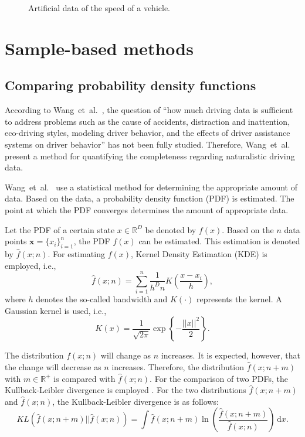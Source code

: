 \documentclass[10pt,final,a4paper,oneside,onecolumn]{article}
\newlength\figurewidth
\newlength\figureheight
\newcommand*{\ud}{\mathrm{\,d}}                                 %
\theoremstyle{plain}\newtheorem{definition}{Definition}[section]    %
\theoremstyle{definition}\newtheorem{example}{Example}[section]     %
\theoremstyle{remark}\newtheorem{remarkenv}{Remark}[section]        %
\begin{document}
\setlength{}              %
\setlength{}              %
\begin{figure}[b]
	\centering
	
	\caption{Artificial data of the speed of a vehicle.}
	\label{fig:artificial data}
\end{figure}



\section{Sample-based methods}
\label{sec:sample based}


\subsection{Comparing probability density functions}
\label{sec:sample based pdf}

According to Wang~et~al.~\cite{wang2017much}, the question of ``how much driving data is sufficient to address problems such as the cause of accidents, distraction and inattention, eco-driving styles, modeling driver behavior, and the effects of driver assistance systems on driver behavior'' has not been fully studied. Therefore, Wang~et~al.~\cite{wang2017much} present a method for quantifying the completeness regarding naturalistic driving data. 

Wang~et~al.~\cite{wang2017much} use a statistical method for determining the appropriate amount of data. Based on the data, a probability density function (PDF) is estimated. The point at which the PDF converges determines the amount of appropriate data. 

Let the PDF of a certain state $x \in \mathds{R}^D$ be denoted by $f(x)$. Based on the $n$ data points $\textbf{x}=\{x_i\}_{i=1}^n$, the PDF $f(x)$ can be estimated. This estimation is denoted by $\hat{f}(x;n)$. For estimating $f(x)$, Kernel Density Estimation (KDE) is employed, i.e.,
\begin{equation}
	\hat{f}(x;n) = \sum_{i=1}^n \frac{1}{h^D n} K \left( \frac{x - x_i}{h} \right),
\end{equation}
where $h$ denotes the so-called bandwidth and $K(\cdot)$ represents the kernel. A Gaussian kernel is used, i.e.,
\begin{equation}
	K(x) = \frac{1}{\sqrt{2\pi}} \exp \left\{ -\frac{||x||^2}{2}\right\}.
\end{equation}

The distribution $f(x;n)$ will change as $n$ increases. It is expected, however, that the change will decrease as $n$ increases. Therefore, the distribution $\hat{f}(x;n+m)$ with $m \in \mathds{R}^+$ is compared with $\hat{f}(x;n)$. For the comparison of two PDFs, the Kullback-Leibler divergence is employed \cite{bishop2006pattern}. For the two distributions $\hat{f}(x;n+m)$ and $\hat{f}(x;n)$, the Kullback-Leibler divergence is as follows:
\begin{equation}
	KL\left( \hat{f}(x;n+m) || \hat{f}(x;n) \right) = \int \hat{f}(x;n+m) \ln \left( \frac{\hat{f}(x;n+m)}{\hat{f}(x;n)} \right) \ud x.
\end{equation}

\printbibliography
\end{document}
